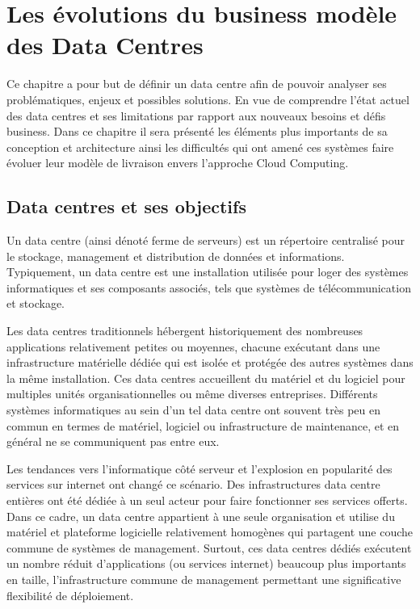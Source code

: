 
\chapter{Les évolutions du business modèle des Data Centres}
\label{chap-1}

Ce chapitre a pour but de définir un data centre afin de pouvoir analyser ses problématiques, enjeux et possibles solutions. En vue de comprendre l'état actuel des data centres et ses limitations par rapport aux nouveaux besoins et défis business. Dans ce chapitre il sera présenté les éléments plus importants de sa conception et architecture ainsi les difficultés qui ont amené ces systèmes faire évoluer leur modèle de livraison envers l'approche Cloud Computing.

\section{Data centres et ses objectifs}

Un data centre (ainsi dénoté ferme de serveurs) est un répertoire centralisé pour le stockage, management et distribution de données et informations. Typiquement, un data centre est une installation utilisée pour loger des systèmes informatiques et ses composants associés, tels que systèmes de télécommunication et stockage. 

Les data centres traditionnels hébergent historiquement des nombreuses applications relativement petites ou moyennes, chacune exécutant dans une infrastructure matérielle dédiée qui est isolée et protégée des autres systèmes dans la même installation. Ces data centres accueillent du matériel et du logiciel pour multiples unités organisationnelles ou même diverses entreprises. Différents systèmes informatiques au sein d'un tel data centre ont souvent très peu en commun en termes de matériel, logiciel ou infrastructure de maintenance, et en général ne se communiquent pas entre eux. 


Les tendances vers l'informatique côté serveur et l'explosion en popularité des services sur internet ont changé ce scénario. Des infrastructures data centre entières ont été dédiée à un seul acteur pour faire fonctionner ses services offerts. Dans ce cadre, un data centre appartient à une seule organisation et utilise du matériel et plateforme logicielle relativement homogènes qui partagent une couche commune de systèmes de management. Surtout, ces data centres dédiés exécutent un nombre réduit d'applications (ou services internet) beaucoup plus importants en taille, l'infrastructure commune de management permettant une significative flexibilité de déploiement. 


